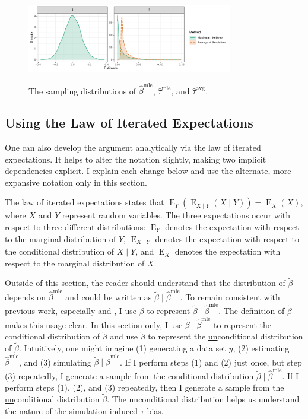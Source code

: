 \documentclass[12pt]{article}
\DeclareMathOperator*{\E}{\text{E}}
\begin{document}
\begin{figure}[!h]
\begin{center}
\includegraphics[width=0.8\textwidth]{figs/intuition-sampling.pdf}\\
\vspace{.03in}
\caption{The sampling distributions of $\hat{\beta}^\text{mle}$, $\hat{\tau}^\text{mle}$, and $\hat{\tau}^\text{avg}$.}\label{fig:int-samp}
\end{center}
\end{figure}

\subsection*{Using the Law of Iterated Expectations}

One can also develop the argument analytically via the law of iterated expectations. It helps to alter the notation slightly, making two implicit dependencies explicit. I explain each change below and use the alternate, more expansive notation only in this section.

The law of iterated expectations states that $\E_Y \left( \E_{X \mid Y}(X \mid Y) \right) = \E_X(X)$, where $X$ and $Y$ represent random variables.
The three expectations occur with respect to three different distributions: $\E_Y$ denotes the expectation with respect to the marginal distribution of $Y$, $\E_{X \mid Y}$ denotes the expectation with respect to the conditional distribution of $X \mid Y$, and $\E_X$ denotes the expectation with respect to the marginal distribution of $X$.

Outside of this section, the reader should understand that the distribution of $\tilde{\beta}$ depends on $\hat{\beta}^\text{mle}$ and could be written as $\tilde{\beta} \mid \hat{\beta}^\text{mle}$.
To remain consistent with previous work, especially \cite{KingTomzWittenberg2000} and \cite{Herron1999}, I use $\tilde{\beta}$ to represent $\tilde{\beta} \mid \hat{\beta}^\text{mle}$.
The definition of $\tilde{\beta}$ makes this usage clear.
In this section only, I use $\tilde{\beta} \mid \hat{\beta}^\text{mle}$ to represent the conditional distribution of $\tilde{\beta}$ and use $\tilde{\beta}$ to represent the \underline{un}conditional distribution of $\tilde{\beta}$.
Intuitively, one might imagine (1) generating a data set $y$, (2) estimating $\hat{\beta}^\text{mle}$, and (3) simulating $\tilde{\beta} \mid \hat{\beta}^\text{mle}$.
If I perform steps (1) and (2) just once, but step (3) repeatedly, I generate a sample from the conditional distribution $\tilde{\beta} \mid \hat{\beta}^\text{mle}$.
If I perform steps (1), (2), and (3) repeatedly, then I generate a sample from the \underline{un}conditional distribution $\tilde{\beta}$.
The unconditional distribution helps us understand the nature of the simulation-induced $\tau$-bias.
\end{document}
